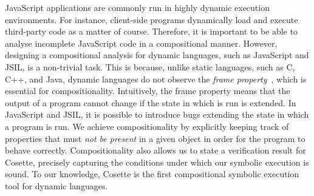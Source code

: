 \documentclass[sigconf, anonymous, review]{acmart}
\newcommand{\jsil}{JSIL\xspace}
\newcommand{\cosette}{Cosette\xspace}
\newcommand{\myparagraph}[1]{\smallskip\noindent {\bf #1.}\hspace{1pt}}
\begin{document}
\myparagraph{Compositionality} JavaScript applications are commonly run in 
highly dynamic execution environments. For instance, client-side programs dynamically load and execute third-party code as a matter of course. Therefore, it is important to be able to analyse incomplete JavaScript code in a compositional manner.
However, designing a compositional analysis for dynamic languages, such as JavaScript and \jsil, is a non-trivial task. This is because, unlike static languages, such as C, C++, and Java, dynamic languages do not observe the \emph{frame property}~\cite{?}, which is essential for compositionality. Intuitively, the frame property means that the output of a program cannot change if the state in which is run is extended. In JavaScript and \jsil, it is possible to introduce bugs extending the state in which a program is run.
%
We achieve compositionality by explicitly keeping track of properties that must {\em not be present} in a given object in order for the program to behave correctly.
Compositionality also allows us to state a verification result for \cosette, precisely capturing the conditions under which our symbolic execution is sound.
To our knowledge, \cosette is the first compositional symbolic execution tool for dynamic languages.



%
%
%
%
%
%
\end{document}
